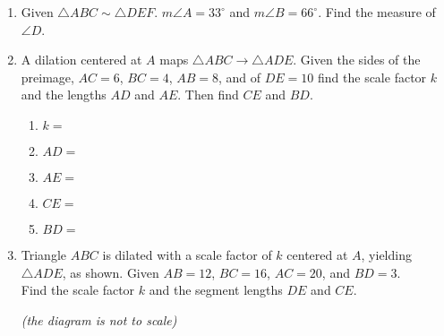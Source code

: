 \documentclass[12pt, twoside]{article}
\begin{document}
\begin{enumerate}
\item Given $\triangle ABC \sim \triangle DEF$. $m\angle A = 33^\circ$ and $m\angle B = 66^\circ$. Find the measure of $\angle D$.
    
\newpage
\item A dilation centered at $A$ maps $\triangle ABC \rightarrow \triangle ADE$. Given the sides of the preimage, $AC = 6$, $BC = 4$, $AB = 8$, and of $DE = 10$ find the scale factor $k$ and the lengths $AD$ and $AE$. Then find $CE$ and $BD$. 
  \begin{multicols}{2}
    \begin{enumerate}
      \item $k=$ \vspace{0.3cm}
      \item $AD=$ \vspace{0.3cm}
      \item $AE=$ \vspace{0.3cm}
      \item $CE=$
      \item $BD=$
    \end{enumerate}
  \begin{flushright}
  \end{flushright} 
\end{multicols}\vspace{1.5cm}
  
\item Triangle $ABC$ is dilated with a scale factor of $k$ centered at $A$, yielding $\triangle ADE$, as shown. Given $AB=12$, $BC=16$, $AC=20$, and $BD=3$. \\[0.25cm] Find the scale factor $k$ and the segment lengths $DE$ and $CE$.
  \begin{flushright} \emph{(the diagram is not to scale)} \end{flushright}
    \begin{flushright}
    \end{flushright} \vspace{2.5cm}


\end{enumerate}
\end{document}
